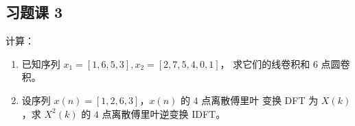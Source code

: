 \subsection{习题课 3}

\begin{exercise}
    计算：
    \begin{enumerate}[label=(\arabic*)]
        \item 已知序列 $x_1 = [1, 6, 5, 3], x_2 = [2, 7, 5, 4, 0, 1]$，
            求它们的线卷积和 $6$ 点圆卷积。
        \item 设序列 $x(n) = [1, 2, 6, 3]$，$x(n)$ 的 $4$ 点离散傅里叶
            变换 DFT 为 $X(k)$，求 $X^2(k)$ 的 $4$ 点离散傅里叶逆变换 IDFT。
    \end{enumerate}
\end{exercise}


